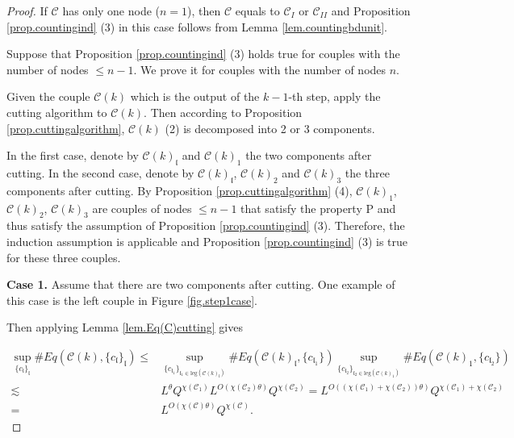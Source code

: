\begin{proof}
If $\mathcal{C}$ has only one node ($n=1$), then $\mathcal{C}$ equals to $\mathcal{C}_{I}$ or $\mathcal{C}_{II}$ and Proposition \ref{prop.countingind} (3) in this case follows from Lemma \ref{lem.countingbdunit}.

Suppose that Proposition \ref{prop.countingind} (3) holds true for couples with the number of nodes $\le n-1$. We prove it for couples with the number of nodes $n$. 

Given the couple $\mathcal{C}(k)$ which is the output of the $k-1$-th step, apply the cutting algorithm to $\mathcal{C}(k)$. Then according to Proposition \ref{prop.cuttingalgorithm}, $\mathcal{C}(k)$ (2) is decomposed into 2 or 3 components.

In the first case, denote by $\mathcal{C}(k)_{
\mathfrak{l}}$ and $\mathcal{C}(k)_1$ the two components after cutting. In the second case, denote by $\mathcal{C}(k)_{
\mathfrak{l}}$, $\mathcal{C}(k)_2$ and $\mathcal{C}(k)_3$ the three components after cutting. By Proposition \ref{prop.cuttingalgorithm} (4), $\mathcal{C}(k)_1$, $\mathcal{C}(k)_2$, $\mathcal{C}(k)_3$ are couples of nodes $\le n-1$ that satisfy the property P and thus satisfy the assumption of Proposition \ref{prop.countingind} (3). Therefore, the induction assumption is applicable and Proposition \ref{prop.countingind} (3) is true for these three couples.

\textbf{Case 1.} Assume that there are two components after cutting. One example of this case is the left couple in Figure \ref{fig.step1case}.
    
Then applying Lemma \ref{lem.Eq(C)cutting} gives

\begin{equation}
\begin{split}
    \sup_{\{c_{\mathfrak{l}}\}_{\mathfrak{l}}}\#Eq(\mathcal{C}(k),\{c_{\mathfrak{l}}\}_{\mathfrak{l}})\le&
    \sup_{\{c_{\mathfrak{l}_1}\}_{\mathfrak{l}_1\in \text{leg}(\mathcal{C}(k)_{
\mathfrak{l}})} } \# Eq(\mathcal{C}(k)_{
\mathfrak{l}},\{c_{\mathfrak{l}_1}\}) \sup_{\{c_{\mathfrak{l}_2}\}_{\mathfrak{l}_2\in \text{leg}(\mathcal{C}(k)_1)} }\# Eq(\mathcal{C}(k)_1, \{c_{\mathfrak{l}_2}\})
    \\
    \lesssim&  L^{\theta} Q^{\chi(\mathcal{C}_1)} L^{O(\chi(\mathcal{C}_2)\theta)} Q^{\chi(\mathcal{C}_2)} = L^{O((\chi(\mathcal{C}_1)+\chi(\mathcal{C}_2))\theta)} Q^{\chi(\mathcal{C}_1)+\chi(\mathcal{C}_2)} \\
    =& L^{O(\chi(\mathcal{C})\theta)} Q^{\chi(\mathcal{C})}.
\end{split}
\end{equation}


\end{proof}

